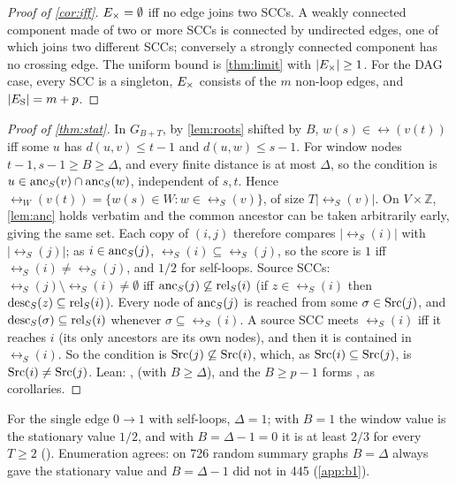 \begin{proof}[Proof of \cref{cor:iff}]
$E_{\times}=\emptyset$ iff no edge joins two SCCs. A weakly connected component made of
two or more SCCs is connected by undirected edges, one of which joins two
different SCCs; conversely a strongly connected component has no crossing
edge. The uniform bound is \cref{thm:limit} with $|E_{\times}|\ge1$. For the DAG case,
every SCC is a singleton, $E_{\times}$ consists of the $m$ non-loop edges, and
$|E_{\mathrm S}|=m+p$.
\end{proof}

\begin{proof}[Proof of \cref{thm:stat}]
In $G_{B+T}$, by \cref{lem:roots} shifted by $B$, $w(s)\in\rel(v(t))$ iff some
$u$ has $d(u,v)\le t-1$ and $d(u,w)\le s-1$. For window nodes $t-1,s-1\ge
B\ge\Delta$, and every finite distance is at most $\Delta$, so the condition is
$u\in\mathrm{anc}_S(v)\cap\mathrm{anc}_S(w)$, independent of $s,t$. Hence
$\rel_W(v(t))=\{w(s)\in W: w\in\rel_S(v)\}$, of size $T|\rel_S(v)|$. On
$V\times\mathbb Z$, \cref{lem:anc} holds verbatim and the common ancestor can
be taken arbitrarily early, giving the same set. Each copy of $(i,j)$ therefore
compares $|\rel_S(i)|$ with $|\rel_S(j)|$; as $i\in\mathrm{anc}_S(j)$,
$\rel_S(i)\subseteq\rel_S(j)$, so the score is $1$ iff
$\rel_S(i)\ne\rel_S(j)$, and $1/2$ for self-loops.
Source SCCs: $\rel_S(j)\setminus\rel_S(i)\ne\emptyset$ iff
$\mathrm{anc}_S(j)\not\subseteq\mathrm{rel}_S(i)$ (if $z\in\rel_S(i)$ then
$\mathrm{desc}_S(z)\subseteq\mathrm{rel}_S(i)$). Every node of $\mathrm{anc}_S(j)$ is reached from some
$\sigma\in\mathrm{Src}(j)$, and $\mathrm{desc}_S(\sigma)\subseteq\mathrm{rel}_S(i)$ whenever
$\sigma\subseteq\rel_S(i)$. A source SCC meets $\rel_S(i)$ iff it reaches $i$
(its only ancestors are its own nodes), and then it is contained in
$\rel_S(i)$. So the condition is $\mathrm{Src}(j)\not\subseteq\mathrm{Src}(i)$, which, as
$\mathrm{Src}(i)\subseteq\mathrm{Src}(j)$, is $\mathrm{Src}(i)\ne\mathrm{Src}(j)$. Lean:
,  (with $B\ge\Delta$), and the
$B\ge p-1$ forms ,  as corollaries.
\end{proof}

\begin{remark}\label{rem:sharp}
For the single edge $0\to1$ with self-loops, $\Delta=1$; with $B=1$ the window
value is the stationary value $1/2$, and with $B=\Delta-1=0$ it is at least
$2/3$ for every $T\ge2$ (). Enumeration agrees: on 726
random summary graphs $B=\Delta$ always gave the stationary value and $B=\Delta-1$
did not in 445 (\cref{app:b1}).
\end{remark}

